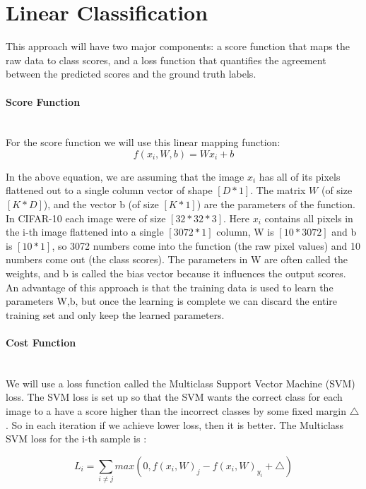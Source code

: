 \section{Linear Classification}
This approach will have two major components: a score function that maps the raw data to class scores, and a loss function that quantifies the agreement between the predicted scores and the ground truth labels. 


\paragraph{Score Function}
\leavevmode \\
For the score function we will use this linear mapping function:
\begin{equation}
 f(x_{i},W,b) = Wx_{i}+b
 \end{equation}
 
In the above equation, we are assuming that the image $x_{i}$ has all of its pixels flattened out to a single column vector of shape $[D*1]$. The matrix $W$ (of size $[K * D]$), and the vector b (of size $[K * 1]$) are the parameters of the function. In CIFAR-10 each image were of size $[32*32*3]$. Here  $x_{i}$ contains all pixels in the i-th image flattened into a single $[3072 * 1]$ column, W is $[10 * 3072]$ and b is $[10 * 1]$, so 3072 numbers come into the function (the raw pixel values) and 10 numbers come out (the class scores). The parameters in W are often called the weights, and b is called the bias vector because it influences the output scores.\hfill \break
An advantage of this approach is that the training data is used to learn the parameters W,b, but once the learning is complete we can discard the entire training set and only keep the learned parameters.
\paragraph{Cost Function}
\leavevmode \\
We will use a loss function called the Multiclass Support Vector Machine (SVM) loss. The SVM loss is set up so that the SVM wants the correct class for each image to a have a score higher than the incorrect classes by some fixed margin $\triangle$. So in each iteration if we achieve lower loss, then it is better. The Multiclass SVM loss for the i-th sample is :

\begin{equation}
 L_{i} =\sum_{i\not=j}max(0,f(x_{i},W)_{j}-f(x_{i},W)_{y_{i}}+\triangle)
 \end{equation}
 
